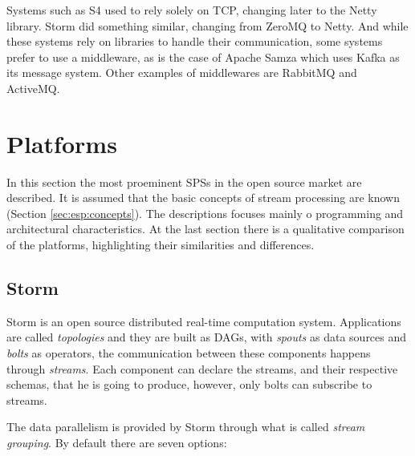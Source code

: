 \documentclass[ppgc,diss,english]{iiufrgs}
\begin{document}
Systems such as S4 used to rely solely on TCP, changing later to the Netty library. Storm did something similar, changing from ZeroMQ to Netty. And while these systems rely on libraries to handle their communication, some systems prefer to use a middleware, as is the case of Apache Samza which uses Kafka as its message system. Other examples of middlewares are RabbitMQ and ActiveMQ.


\section{Platforms}
\label{sec:esp:platforms}

In this section the most proeminent SPSs in the open source market are described. It is assumed that the basic concepts of stream processing are known (Section \ref{sec:esp:concepts}). The descriptions focuses mainly o programming and architectural characteristics. At the last section there is a qualitative comparison of the platforms, highlighting their similarities and differences.

\subsection{Storm}

Storm is an open source distributed real-time computation system. Applications are called \emph{topologies} and they are built as DAGs, with \emph{spouts} as data sources and \emph{bolts} as operators, the communication between these components happens through \emph{streams}. Each component can declare the streams, and their respective schemas, that he is going to produce, however, only bolts can subscribe to streams.

The data parallelism is provided by Storm through what is called \emph{stream grouping}. By default there are seven options:
\end{document}
